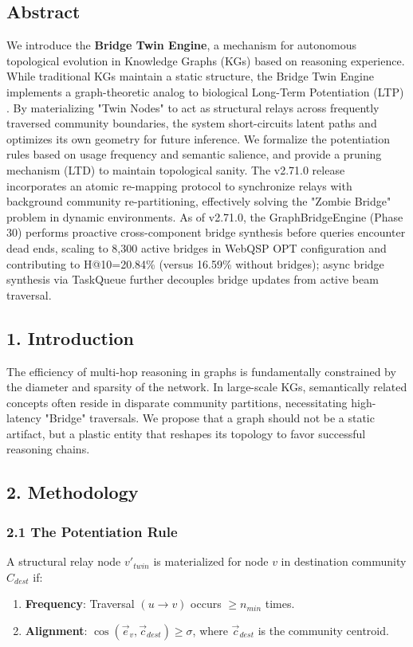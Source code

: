 
\subsection*{Abstract}
We introduce the \textbf{Bridge Twin Engine}, a mechanism for autonomous topological evolution in Knowledge Graphs (KGs) based on reasoning experience. While traditional KGs maintain a static structure, the Bridge Twin Engine implements a graph-theoretic analog to biological Long-Term Potentiation (LTP) \cite{hebb1949, bipoo1998}. By materializing "Twin Nodes" to act as structural relays across frequently traversed community boundaries, the system short-circuits latent paths and optimizes its own geometry for future inference. We formalize the potentiation rules based on usage frequency and semantic salience, and provide a pruning mechanism (LTD) to maintain topological sanity. The v2.71.0 release incorporates an atomic re-mapping protocol to synchronize relays with background community re-partitioning, effectively solving the "Zombie Bridge" problem in dynamic environments. As of v2.71.0, the GraphBridgeEngine (Phase 30) performs proactive cross-component bridge synthesis before queries encounter dead ends, scaling to 8,300 active bridges in WebQSP OPT configuration and contributing to H@10=20.84\% (versus 16.59\% without bridges); async bridge synthesis via TaskQueue further decouples bridge updates from active beam traversal.

\subsection*{1. Introduction}
The efficiency of multi-hop reasoning in graphs is fundamentally constrained by the diameter and sparsity of the network. In large-scale KGs, semantically related concepts often reside in disparate community partitions, necessitating high-latency "Bridge" traversals. We propose that a graph should not be a static artifact, but a plastic entity that reshapes its topology to favor successful reasoning chains.

\subsection*{2. Methodology}

\subsubsection*{2.1 The Potentiation Rule}
A structural relay node $v'_{twin}$ is materialized for node $v$ in destination community $C_{dest}$ if:
\begin{enumerate}
  \item  \textbf{Frequency}: Traversal $(u \to v)$ occurs $\geq n_{min}$ times.
  \item  \textbf{Alignment}: $\cos(\vec{e}_v, \vec{c}_{dest}) \geq \sigma$, where $\vec{c}_{dest}$ is the community centroid.
\end{enumerate}


